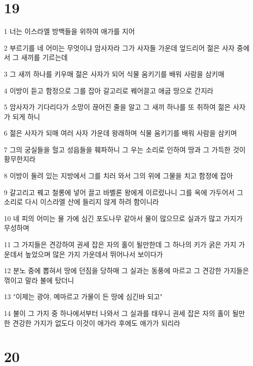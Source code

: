 \chapter{19}

\par 1 너는 이스라엘 방백들을 위하여 애가를 지어
\par 2 부르기를 네 어미는 무엇이냐 암사자라 그가 사자들 가운데 엎드리어 젊은 사자 중에서 그 새끼를 기르는데
\par 3 그 새끼 하나를 키우매 젊은 사자가 되어 식물 움키기를 배워 사람을 삼키매
\par 4 이방이 듣고 함정으로 그를 잡아 갈고리로 꿰어끌고 애굽 땅으로 간지라
\par 5 암사자가 기다리다가 소망이 끊어진 줄을 알고 그 새끼 하나를 또 취하여 젊은 사자가 되게 하니
\par 6 젊은 사자가 되매 여러 사자 가운데 왕래하며 식물 움키기를 배워 사람을 삼키며
\par 7 그의 궁실들을 헐고 성읍들을 훼파하니 그 우는 소리로 인하여 땅과 그 가득한 것이 황무한지라
\par 8 이방이 둘려 있는 지방에서 그를 치러 와서 그의 위에 그물을 치고 함정에 잡아
\par 9 갈고리고 꿰고 철롱에 넣어 끌고 바벨론 왕에게 이르렀나니 그를 옥에 가두어서 그 소리로 다시 이스라엘 산에 들리지 않게 하려 함이니라
\par 10 네 피의 어미는 물 가에 심긴 포도나무 같아서 물이 많으므로 실과가 많고 가지가 무성하며
\par 11 그 가지들은 견강하여 권세 잡은 자의 홀이 될만한데 그 하나의 키가 굵은 가지 가운데서 높았으며 많은 가지 가운데서 뛰어나서 보이다가
\par 12 분노 중에 뽑혀서 땅에 던짐을 당하매 그 실과는 동풍에 마르고 그 견강한 가지들은 꺾이고 말라 불에 탔더니
\par 13 "이제는 광야, 메마르고 가물이 든 땅에 심긴바 되고"
\par 14 불이 그 가지 중 하나에서부터 나와서 그 실과를 태우니 권세 잡은 자의 홀이 될만한 견강한 가지가 없도다 이것이 애가라 후에도 애가가 되리라

\chapter{20}


